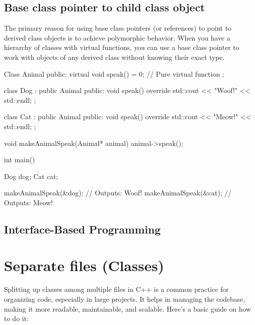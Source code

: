 \documentclass{report}
\begin{document}
    \subsection{Base class pointer to child class object}
    \bigbreak \noindent 
    The primary reason for using base class pointers (or references) to point to derived class objects is to achieve polymorphic behavior. When you have a hierarchy of classes with virtual functions, you can use a base class pointer to work with objects of any derived class without knowing their exact type.
    \bigbreak \noindent 
    \begin{cppcode}
Class Animal {
public:
    virtual void speak() = 0; // Pure virtual function
};

class Dog : public Animal {
public:
    void speak() override { std::cout << "Woof!" << std::endl; }
};

class Cat : public Animal {
public:
    void speak() override { std::cout << "Meow!" << std::endl; }
};

void makeAnimalSpeak(Animal* animal) {
    animal->speak();
}

int main() {
    Dog dog;
    Cat cat;

    makeAnimalSpeak(&dog); // Outputs: Woof!
    makeAnimalSpeak(&cat); // Outputs: Meow!
}
    \end{cppcode}

    \pagebreak \bigbreak \noindent 
    \subsection{Interface-Based Programming}
    \bigbreak \noindent 


    
    
    
    

    \pagebreak \bigbreak \noindent 
    \section{Separate files (Classes)}
    \bigbreak \noindent 
    \begin{concept}
       Splitting up classes among multiple files in C++ is a common practice for organizing code, especially in large projects. It helps in managing the codebase, making it more readable, maintainable, and scalable. Here's a basic guide on how to do it:
    \end{concept}
    \bigbreak \noindent 
\end{document}
